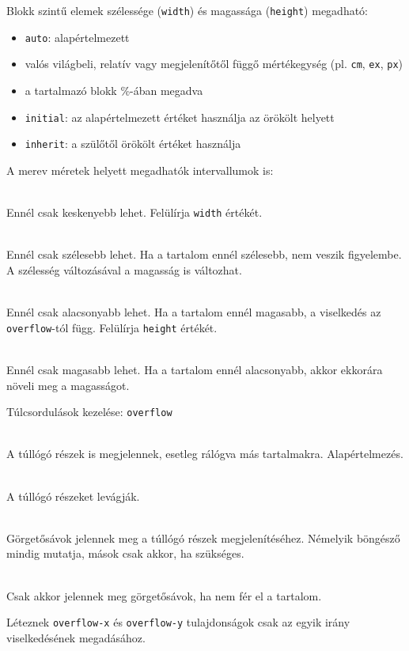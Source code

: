 \begin{frame}
  Blokk szintű elemek szélessége (\texttt{width}) és magassága (\texttt{height}) megadható:
  \begin{itemize}
    \item \texttt{auto}: alapértelmezett
    \item valós világbeli, relatív vagy megjelenítőtől függő mértékegység (pl. \texttt{cm}, \texttt{ex}, \texttt{px})
    \item a tartalmazó blokk \%-ában megadva
    \item \texttt{initial}: az alapértelmezett értéket használja az örökölt helyett
    \item \texttt{inherit}: a szülőtől örökölt értéket használja
  \end{itemize}
\end{frame}

\begin{frame}
  A merev méretek helyett megadhatók intervallumok is:
  \begin{description}[m]
    \item[\texttt{max-width}] \hfill \\ Ennél csak keskenyebb lehet. Felülírja \texttt{width} értékét.
    \item[\texttt{min-width}] \hfill \\ Ennél csak szélesebb lehet. Ha a tartalom ennél szélesebb, nem veszik figyelembe. A szélesség változásával a magasság is változhat.
    \item[\texttt{max-height}] \hfill \\ Ennél csak alacsonyabb lehet. Ha a tartalom ennél magasabb, a viselkedés az \texttt{overflow}-tól függ. Felülírja \texttt{height} értékét.
    \item[\texttt{min-height}] \hfill \\ Ennél csak magasabb lehet. Ha a tartalom ennél alacsonyabb, akkor ekkorára növeli meg a magasságot.
  \end{description}
\end{frame}

\begin{frame}
  Túlcsordulások kezelése: \texttt{overflow}
  \begin{description}[m]
    \item[\texttt{visible}] \hfill \\ A túllógó részek is megjelennek, esetleg rálógva más tartalmakra. Alapértelmezés.
    \item[\texttt{hidden}] \hfill \\ A túllógó részeket levágják.
    \item[\texttt{scroll}] \hfill \\ Görgetősávok jelennek meg a túllógó részek megjelenítéséhez. Némelyik böngésző mindig mutatja, mások csak akkor, ha szükséges.
    \item[\texttt{auto}] \hfill \\ Csak akkor jelennek meg görgetősávok, ha nem fér el a tartalom.
  \end{description}
  \vfill
  Léteznek \texttt{overflow-x} és \texttt{overflow-y} tulajdonságok csak az egyik irány viselkedésének megadásához.
\end{frame}

